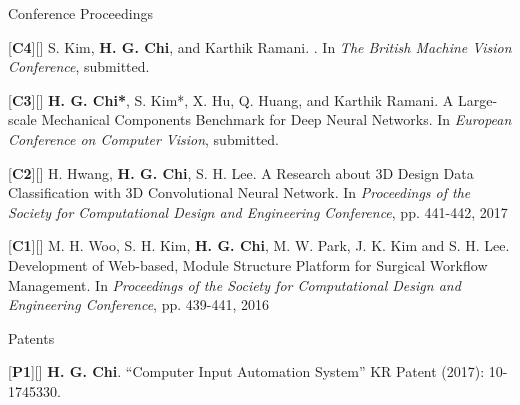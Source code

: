 \begin{cventries}
\cvpub
{Conference Proceedings} %
{ %
\begin{cvitems}
\item {[\textbf{C4}][\href{https://docs.google.com/viewer?url=https://github.com/stnoah1/CV/raw/master/documents/RGBDT.pdf}{}] S. Kim, \textbf{H. G. Chi}, and Karthik Ramani. . In \textit{The British Machine Vision Conference}, submitted.}
\item {[\textbf{C3}][\href{https://docs.google.com/viewer?url=https://github.com/stnoah1/CV/raw/master/documents/MCB.pdf}{}] \textbf{H. G. Chi*}, S. Kim*, X. Hu, Q. Huang, and Karthik Ramani. A Large-scale Mechanical Components Benchmark for Deep Neural Networks. In \textit{European Conference on Computer Vision}, submitted.}
\item {[\textbf{C2}][\href{https://docs.google.com/viewer?url=https://github.com/stnoah1/CV/raw/master/documents/3DM.pdf}{}] H. Hwang, \textbf{H. G. Chi}, S. H. Lee. A Research about 3D Design Data Classification with 3D Convolutional Neural Network. In \textit{Proceedings of the Society for Computational Design and Engineering Conference}, pp. 441-442, 2017}
\item {[\textbf{C1}][\href{https://docs.google.com/viewer?url=https://github.com/stnoah1/CV/raw/master/documents/SWORM.pdf}{}] M. H. Woo, S. H. Kim, \textbf{H. G. Chi}, M. W. Park, J. K. Kim and S. H. Lee. Development of Web-based, Module Structure Platform for Surgical Workflow Management. In \textit{Proceedings of the Society for Computational Design and Engineering Conference}, pp. 439-441, 2016}
\end{cvitems}
}


\cvpub
{Patents}{
\begin{cvitems}
\item {[\textbf{P1}][\href{https://docs.google.com/viewer?url=https://github.com/stnoah1/CV/raw/master/documents/patent.pdf}{}] \textbf{H. G. Chi}.  “Computer Input Automation System” KR Patent (2017): 10-1745330.}
\end{cvitems}
}



\end{cventries}
